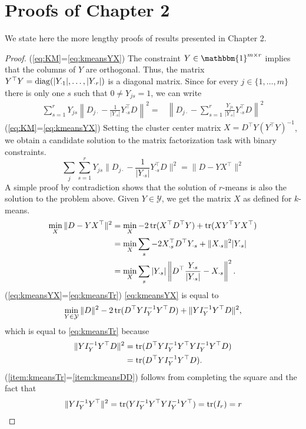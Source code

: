 \chapter{Proofs of Chapter 2}\label{chap:AppendixZS}
We state here the more lengthy proofs of results presented in Chapter 2.
\kmeansobj*
\begin{proof}
(\eqref{eq:KM}=\eqref{eq:kmeansYX}) The constraint $Y\in\mathbbm{1}^{m\times r}$ implies that the columns of $Y$ are orthogonal. Thus, the matrix $Y^\top Y=\operatorname{diag}(|Y_{\cdot 1}|,\ldots,|Y_{\cdot r}|)$ is a diagonal matrix. Since for every $j\in\{1,\ldots, m\}$ there is only one $s$ such that $0\neq Y_{js}=1$, we can write 
\begin{align*}
\sum_{s=1}^rY_{js}\left\|D_{j\cdot}-\frac{1}{|Y_{\cdot s}|}Y_{\cdot s}^\top D\right\|^2 
=& \left\|D_{j\cdot}-\sum_{s=1}^r\frac{Y_{js}}{|Y_{\cdot s}|}Y_{\cdot s}^\top D\right\|^2
\end{align*}
(\eqref{eq:KM}=\eqref{eq:kmeansYX})
Setting the cluster center matrix $X=D^\top Y(Y^\top Y)^{-1}$, we obtain a candidate solution to the matrix factorization task with binary constraints.
\[\sum_j\sum_{s=1}^rY_{js}\|D_{j\cdot}-\frac{1}{|Y_{\cdot s}|}Y_{\cdot s}^\top D\|^2=\|D-YX^\top\|^2\]
A simple proof by contradiction shows that the solution of $r$-means is also the solution to the problem above.  Given $Y\in\mathcal{Y}$, we get the matrix $X$ as defined for $k$-means.
\begin{align}
\min_X \|D-YX^\top\|^2 &= \min_X -2\operatorname*{tr}(X^\top D^\top Y) + \operatorname*{tr}(XY^\top Y X^\top)\nonumber\\
&= \min_X\sum_s -2X_{\cdot s}^\top D^\top Y_{\cdot s} +\|X_{\cdot s}\|^2|Y_{\cdot s}|\nonumber\\
	&= \min_X\sum_s |Y_{\cdot s}|\left\|D^\top \frac{Y_{\cdot s}}{|Y_{\cdot s}|}-X_{\cdot s}\right\|^2. \label{eq:proofKMeansX}
\end{align}
(\eqref{eq:kmeansYX}=\eqref{eq:kmeansTr}) \eqref{eq:kmeansYX} is equal to 
\begin{align*}
\min_{Y\in\mathcal{Y}} \|D\|^2 -2\operatorname*{tr}(D^\top YI_Y^{-1}Y^\top D) +\|Y I_Y^{-1}Y^\top D\|^2,
\end{align*}
which is equal to \ref{eq:kmeansTr} because
\begin{align*}
\|Y I_Y^{-1}Y^\top D\|^2&= \operatorname*{tr}(D^\top YI_Y^{-1}Y^\top Y I_Y^{-1}Y^\top D)\\
&=\operatorname*{tr}(D^\top YI_Y^{-1}Y^\top D).
\end{align*}
(\ref{item:kmeansTr}=\ref{item:kmeansDD}) follows from completing the square and the fact that
\begin{align*}
\|YI_Y^{-1}Y^\top\|^2 = \operatorname*{tr}(YI_Y^{-1}Y^\top YI_Y^{-1}Y^\top) = \operatorname*{tr}(I_r)=r 
\end{align*}
\end{proof}

